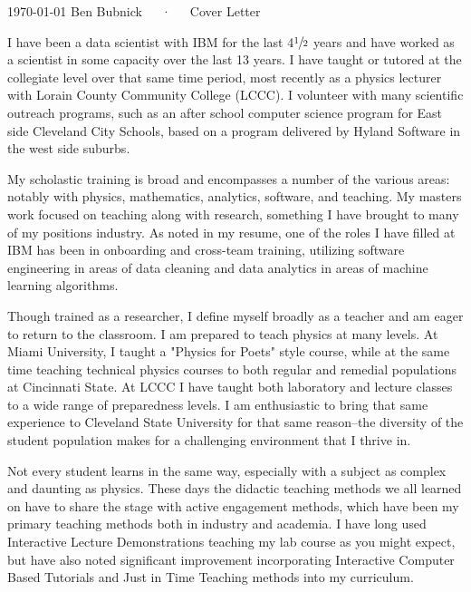 \documentclass[11pt, a4paper]{awesome-cv}
\begin{document}
\makecvheader[R]

\makecvfooter
  {\today}
  {Ben Bubnick~~~·~~~Cover Letter}
  {}

\makelettertitle

\begin{cvletter}

I have been a data scientist with IBM for the last 4$\sfrac{1}{2}$ years and have worked as a scientist in some capacity over the last 13 years.  I have taught or tutored at the collegiate level over that same time period, most recently as a physics lecturer with Lorain County Community College (LCCC).  I volunteer with many scientific outreach programs, such as an after school computer science program for East side Cleveland City Schools, based on a program delivered by Hyland Software in the west side suburbs.

My scholastic training is broad and encompasses a number of the various areas: notably with physics, mathematics, analytics, software, and teaching.  My masters work focused on teaching along with research, something I have brought to many of my positions industry.  As noted in my resume, one of the roles I have filled at IBM has been in onboarding and cross-team training, utilizing software engineering in areas of data cleaning and data analytics in areas of machine learning algorithms.

Though trained as a researcher, I define myself broadly as a teacher and am eager to return to the classroom. I am prepared to teach physics at many levels.  At Miami University, I taught a "Physics for Poets" style course, while at the same time teaching technical physics courses to both regular and remedial populations at Cincinnati State.  At LCCC I have taught both laboratory and lecture classes to a wide range of preparedness levels.  I am enthusiastic to bring that same experience to Cleveland State University for that same reason--the diversity of the student population makes for a challenging environment that I thrive in.

Not every student learns in the same way, especially with a subject as complex and daunting as physics.  These days the didactic teaching methods we all learned on have to share the stage with active engagement methods, which have been my primary teaching methods both in industry and academia.  I have long used Interactive Lecture Demonstrations teaching my lab course as you might expect, but have also noted significant improvement incorporating Interactive Computer Based Tutorials and Just in Time Teaching methods into my curriculum.  %

\end{cvletter}


\makeletterclosing
\end{document}
